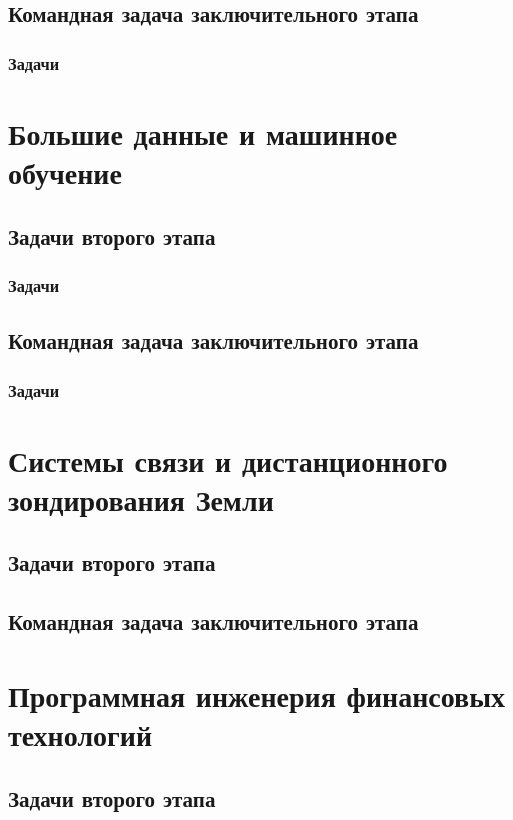 \documentclass[a4paper,12pt,oneside]{book}
\begin{document}
\chapter{Командная задача заключительного этапа}
\section{Задачи}


\part{Большие данные и машинное обучение}
\clearpage
\chapter{Задачи второго этапа}
\section{Задачи}

\clearpage
\chapter{Командная задача заключительного этапа}
\section{Задачи}


\part{Системы связи и дистанционного зондирования Земли}
\clearpage
\chapter{Задачи второго этапа}

\clearpage
\chapter{Командная задача заключительного этапа}


\part{Программная инженерия финансовых технологий}
\clearpage
\chapter{Задачи второго этапа}

\clearpage
\end{document}
